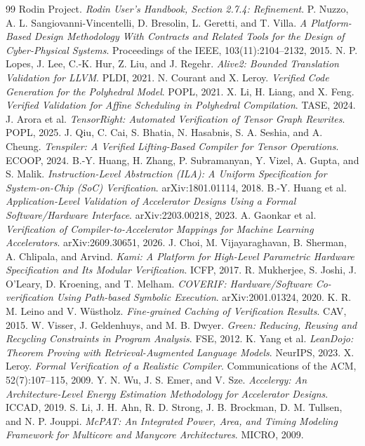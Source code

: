 \documentclass[11pt]{article}
\begin{document}
\begin{thebibliography}{99}
 Rodin Project. \emph{Rodin User's Handbook, Section 2.7.4: Refinement}.
 P. Nuzzo, A. L. Sangiovanni-Vincentelli, D. Bresolin, L. Geretti, and T. Villa. \emph{A Platform-Based Design Methodology With Contracts and Related Tools for the Design of Cyber-Physical Systems}. Proceedings of the IEEE, 103(11):2104--2132, 2015.
 N. P. Lopes, J. Lee, C.-K. Hur, Z. Liu, and J. Regehr. \emph{Alive2: Bounded Translation Validation for LLVM}. PLDI, 2021.
 N. Courant and X. Leroy. \emph{Verified Code Generation for the Polyhedral Model}. POPL, 2021.
 X. Li, H. Liang, and X. Feng. \emph{Verified Validation for Affine Scheduling in Polyhedral Compilation}. TASE, 2024.
 J. Arora et al. \emph{TensorRight: Automated Verification of Tensor Graph Rewrites}. POPL, 2025.
 J. Qiu, C. Cai, S. Bhatia, N. Hasabnis, S. A. Seshia, and A. Cheung. \emph{Tenspiler: A Verified Lifting-Based Compiler for Tensor Operations}. ECOOP, 2024.
 B.-Y. Huang, H. Zhang, P. Subramanyan, Y. Vizel, A. Gupta, and S. Malik. \emph{Instruction-Level Abstraction (ILA): A Uniform Specification for System-on-Chip (SoC) Verification}. arXiv:1801.01114, 2018.
 B.-Y. Huang et al. \emph{Application-Level Validation of Accelerator Designs Using a Formal Software/Hardware Interface}. arXiv:2203.00218, 2023.
 A. Gaonkar et al. \emph{Verification of Compiler-to-Accelerator Mappings for Machine Learning Accelerators}. arXiv:2609.30651, 2026.
 J. Choi, M. Vijayaraghavan, B. Sherman, A. Chlipala, and Arvind. \emph{Kami: A Platform for High-Level Parametric Hardware Specification and Its Modular Verification}. ICFP, 2017.
 R. Mukherjee, S. Joshi, J. O'Leary, D. Kroening, and T. Melham. \emph{COVERIF: Hardware/Software Co-verification Using Path-based Symbolic Execution}. arXiv:2001.01324, 2020.
 K. R. M. Leino and V. Wüstholz. \emph{Fine-grained Caching of Verification Results}. CAV, 2015.
 W. Visser, J. Geldenhuys, and M. B. Dwyer. \emph{Green: Reducing, Reusing and Recycling Constraints in Program Analysis}. FSE, 2012.
 K. Yang et al. \emph{LeanDojo: Theorem Proving with Retrieval-Augmented Language Models}. NeurIPS, 2023.
 X. Leroy. \emph{Formal Verification of a Realistic Compiler}. Communications of the ACM, 52(7):107--115, 2009.
 Y. N. Wu, J. S. Emer, and V. Sze. \emph{Accelergy: An Architecture-Level Energy Estimation Methodology for Accelerator Designs}. ICCAD, 2019.
 S. Li, J. H. Ahn, R. D. Strong, J. B. Brockman, D. M. Tullsen, and N. P. Jouppi. \emph{McPAT: An Integrated Power, Area, and Timing Modeling Framework for Multicore and Manycore Architectures}. MICRO, 2009.

\end{thebibliography}
\end{document}
